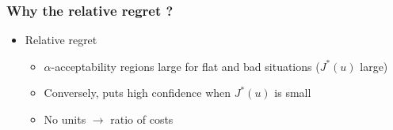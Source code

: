\documentclass[11pt]{beamer}
\newcommand{\Prob}{\mathbb{P}}
\newcommand{\kk}{\theta}
\newcommand{\uu}{u}
\newcommand\manupath{/home/victor/acadwriting/Manuscrit/Text/}
\begin{document}
{             %
    }


\begin{frame}
  \frametitle{Why the relative regret ?}


  
  \renewcommand\rmfamily{\sffamily}
  \begin{center}
  \resizebox{.6\textwidth}{!}{}
\end{center}
  \begin{itemize}
  \item Relative regret
    \begin{itemize}
    \item $\alpha$-acceptability regions large for flat and bad situations ($J^*(\uu)$ large)
    \item Conversely, puts high confidence when $J^*(\uu)$ is small
    \item No units $\rightarrow$ ratio of costs
    \end{itemize}
  \end{itemize}
\end{frame}
\end{document}
